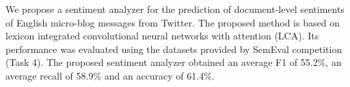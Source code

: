 We propose a sentiment analyzer for the prediction of document-level sentiments of English micro-blog messages from Twitter. The proposed method is based on lexicon integrated convolutional neural networks with attention (LCA). Its performance was evaluated using the datasets provided by SemEval competition (Task 4). The proposed sentiment analyzer obtained an average F1 of 55.2\%, an average recall of 58.9\% and an accuracy of 61.4\%.
